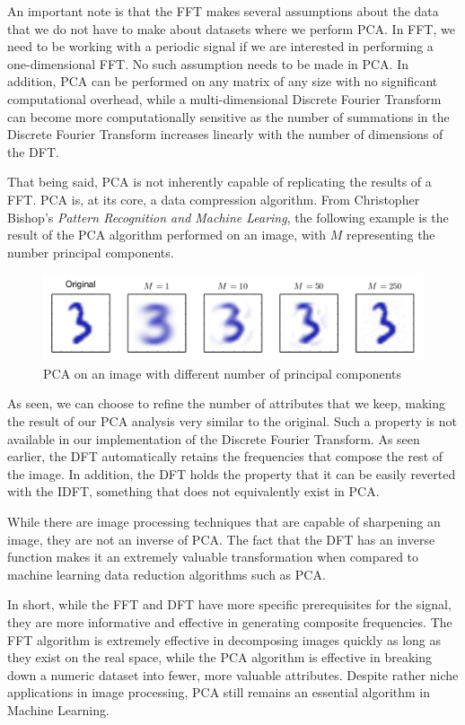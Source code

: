 \documentclass{amsproc}
\begin{document}
An important note is that the FFT makes several assumptions about the data that we do not have to make about datasets where we perform PCA. In FFT, we need to be working with a periodic signal if we are interested in performing a one-dimensional FFT. No such assumption needs to be made in PCA. In addition, PCA can be performed on any matrix of any size with no significant computational overhead, while a multi-dimensional Discrete Fourier Transform can become more computationally sensitive as the number of summations in the Discrete Fourier Transform increases linearly with the number of dimensions of the DFT.

That being said, PCA is not inherently capable of replicating the results of a FFT. PCA is, at its core, a data compression algorithm.  From Christopher Bishop's \textit{Pattern Recognition and Machine Learing}, the following example is the result of the PCA algorithm performed on an image, with $M$ representing the number principal components.

\begin{figure}[h]
	\includegraphics[scale=.65]{images/pca.png}
	\caption{PCA on an image with different number of principal components}
	\label{fig:pca}
\end{figure}

As seen, we can choose to refine the number of attributes that we keep, making the result of our PCA analysis very similar to the original. Such a property is not available in our implementation of the Discrete Fourier Transform. As seen earlier, the DFT automatically retains the frequencies that compose the rest of the image. In addition, the DFT holds the property that it can be easily reverted with the IDFT, something that does not equivalently exist in PCA. 

While there are image processing techniques that are capable of sharpening an image, they are not an inverse of PCA. The fact that the DFT has an inverse function makes it an extremely valuable transformation when compared to machine learning data reduction algorithms such as PCA. 

In short, while the FFT and DFT have more specific prerequisites for the signal, they are more informative and effective in generating composite frequencies. The FFT algorithm is extremely effective in decomposing images quickly as long as they exist on the real space, while the PCA algorithm is effective in breaking down a numeric dataset into fewer, more valuable attributes. Despite rather niche applications in image processing, PCA still remains an essential algorithm in Machine Learning.
\end{document}
